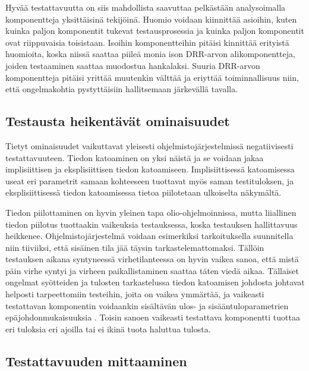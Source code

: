 \documentclass[finnish]{tktltiki2}
\numberwithin{table}{section}
\theoremstyle{definition}
\theoremstyle{remark}
\begin{document}
Hyvää testattavuutta on siis mahdollista saavuttaa pelkästään analysoimalla komponentteja yksittäisinä tekijöinä. Huomio voidaan kiinnittää asioihin, kuten kuinka paljon komponentit tukevat testausprosessia ja kuinka paljon komponentit ovat riippuvaisia toisistaan. Isoihin komponentteihin pitäisi kinnittää erityistä huomioita, koska niissä saattaa piileä monia ison DRR-arvon alikomponentteja, joiden testaaminen saattaa muodostua hankalaksi. Suuria DRR-arvon komponentteja pitäisi yrittää muutenkin välttää ja eriyttää toiminnallisuus niin, että ongelmakohtia pystyttäisiin hallitsemaan järkevällä tavalla.




\subsection{Testausta heikentävät ominaisuudet}

Tietyt ominaisuudet vaikuttavat yleisesti ohjelmistojärjestelmissä negatiivisesti testattavuuteen. Tiedon katoaminen on yksi näistä \citep{Voas:1995:STN:624607.625469} ja se voidaan jakaa implisiittisen ja eksplisiittisen tiedon katoamiseen. Implisiittisessä katoamisessa useat eri parametrit samaan kohteeseen tuottavat myös saman testituloksen, ja eksplisiittisessä tiedon katoamisessa tietoa piilotetaan ulkoiselta näkymältä. 

Tiedon piilottaminen on  hyvin yleinen tapa olio-ohjelmoinnissa, mutta liiallinen tiedon piilotus tuottaakin vaikeuksia testauksessa, koska testauksen hallittavuus heikkenee. Ohjelmistojärjestelmä voidaan esimerkiksi tarkoituksella suunnitella niin tiiviiksi, että sisäinen tila jää täysin tarkastelemattomaksi. Tällöin testauksen aikana syntyneessä virhetilanteessa on hyvin vaikea sanoa, että mistä päin virhe syntyi ja virheen paikallistaminen saattaa täten viedä aikaa. Tällaiset ongelmat syötteiden ja tulosten tarkastelussa tiedon katoamisen johdosta johtavat helposti tarpeettomiin testeihin, joita on vaikea ymmärtää, ja vaikeasti testattavan komponentin voidaankin sisältävän ulos- ja sisääntuloparametrien epäjohdonmukaisuuksia \citep{Voas:1995:STN:624607.625469}. Toisin sanoen vaikeasti testattava komponentti tuottaa eri tuloksia eri ajoilla tai ei ikinä tuota haluttua tulosta.   




\subsection{Testattavuuden mittaaminen} \label{testability_measure}
\end{document}
